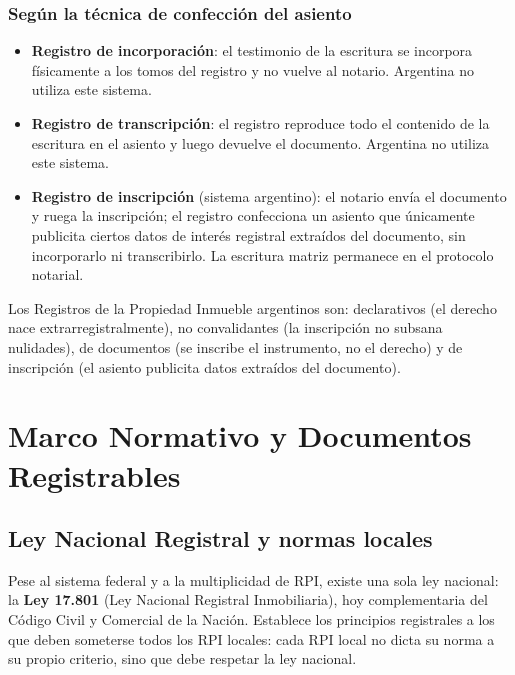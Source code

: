 \documentclass[12pt,oneside]{book}
\begin{document}
\subsection{Según la técnica de confección del asiento}

\begin{itemize}
\item \textbf{Registro de incorporación}: el testimonio de la escritura se incorpora físicamente a los tomos del registro y no vuelve al notario. Argentina no utiliza este sistema.
\item \textbf{Registro de transcripción}: el registro reproduce todo el contenido de la escritura en el asiento y luego devuelve el documento. Argentina no utiliza este sistema.
\item \textbf{Registro de inscripción} (sistema argentino): el notario envía el documento y ruega la inscripción; el registro confecciona un asiento que únicamente publicita ciertos datos de interés registral extraídos del documento, sin incorporarlo ni transcribirlo. La escritura matriz permanece en el protocolo notarial.
\end{itemize}

\begin{important}
Los Registros de la Propiedad Inmueble argentinos son: declarativos (el derecho nace extrarregistralmente), no convalidantes (la inscripción no subsana nulidades), de documentos (se inscribe el instrumento, no el derecho) y de inscripción (el asiento publicita datos extraídos del documento).
\end{important}


\chapter{Marco Normativo y Documentos Registrables}

\section{Ley Nacional Registral y normas locales}

Pese al sistema federal y a la multiplicidad de RPI, existe una sola ley nacional: la \textbf{Ley 17.801} (Ley Nacional Registral Inmobiliaria), hoy complementaria del Código Civil y Comercial de la Nación. Establece los principios registrales a los que deben someterse todos los RPI locales: cada RPI local no dicta su norma a su propio criterio, sino que debe respetar la ley nacional.
\end{document}
